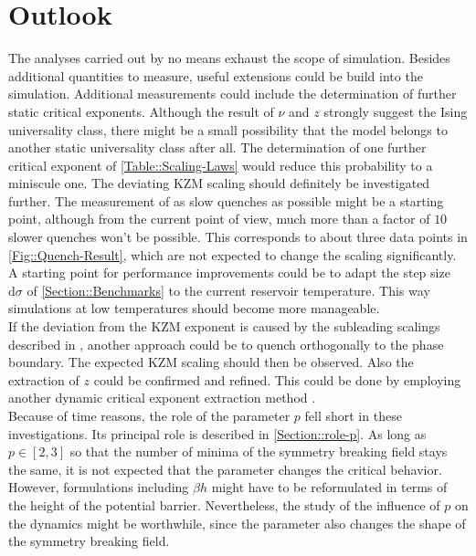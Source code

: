 	\section{Outlook}
	The analyses carried out by no means exhaust the scope of simulation.	Besides additional quantities to measure, useful extensions could be build into the simulation. Additional measurements could include the determination of further static critical exponents. Although the result of $\nu$ and $z$ strongly suggest the Ising universality class, there might be a small possibility that the model belongs to another static universality class after all. The determination of one further critical exponent of \autoref{Table::Scaling-Laws} would reduce this probability to a miniscule one. The deviating KZM	scaling should definitely be investigated further. The measurement of as slow quenches as possible might be a starting point, although from the current point of view, much more than a factor of $10$ slower quenches won't be possible. This corresponds to about three data points in \autoref{Fig::Quench-Result}, which are not expected to change the scaling significantly. A starting point for performance improvements could be to adapt the step size $\text{d}\sigma$ of \autoref{Section::Benchmarks} to the current reservoir temperature. This way simulations at low temperatures should become more manageable.\\ 
	
	If the deviation from the KZM	exponent is caused by the subleading scalings described in \cite{ladewig2020kibble}, another approach could be to quench orthogonally to the phase boundary. The expected KZM scaling should then be observed. Also the extraction of $z$ could be confirmed and refined. This could be done by employing another dynamic critical exponent extraction method \cite{blub}. \\
	
	Because of time reasons, the role of the parameter $p$ fell short in these investigations. Its principal role is described in \autoref{Section::role-p}. As long as $p \in [2, 3]$ so that the number of minima of the symmetry breaking field stays the same, it is not expected that the parameter changes the critical behavior. However, formulations including $\beta h$ might have to be reformulated in terms of the height of the potential barrier. Nevertheless, the study of the influence of $p$ on the dynamics might be worthwhile, since the parameter also changes the shape of the symmetry breaking field. \\ 
	
